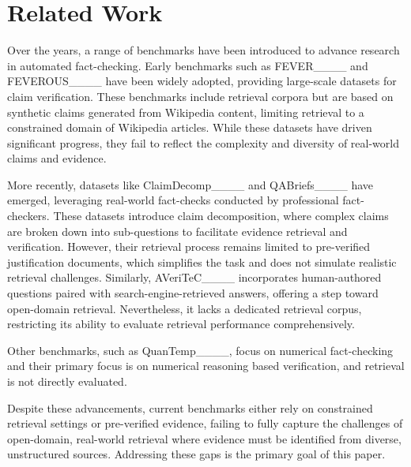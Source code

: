 \section{Related Work}
Over the years, a range of benchmarks have been introduced to advance research in automated fact-checking. Early benchmarks such as FEVER____ and FEVEROUS____ have been widely adopted, providing large-scale datasets for claim verification. These benchmarks include retrieval corpora but are based on synthetic claims generated from Wikipedia content, limiting retrieval to a constrained domain of Wikipedia articles. While these datasets have driven significant progress, they fail to reflect the complexity and diversity of real-world claims and evidence.

More recently, datasets like ClaimDecomp____ and QABriefs____ have emerged, leveraging real-world fact-checks conducted by professional fact-checkers. These datasets introduce claim decomposition, where complex claims are broken down into sub-questions to facilitate evidence retrieval and verification. However, their retrieval process remains limited to pre-verified justification documents, which simplifies the task and does not simulate realistic retrieval challenges. Similarly, AVeriTeC____ incorporates human-authored questions paired with search-engine-retrieved answers, offering a step toward open-domain retrieval. Nevertheless, it lacks a dedicated retrieval corpus, restricting its ability to evaluate retrieval performance comprehensively.

Other benchmarks, such as QuanTemp____, focus on numerical fact-checking and their primary focus is on numerical reasoning based verification, and retrieval is not directly evaluated. 

Despite these advancements, current benchmarks either rely on constrained retrieval settings or pre-verified evidence, failing to fully capture the challenges of open-domain, real-world retrieval where evidence must be identified from diverse, unstructured sources. Addressing these gaps is the primary goal of this paper.